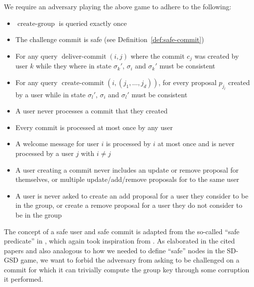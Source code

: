 \begin{definition}
	We require an adversary playing the above game to adhere to the following:
	\begin{itemize}
		\item $\operatorname{create-group}$ is queried exactly once
		\item The challenge commit is safe (see Definition~\ref{def:safe-commit})
		\item For any query $\operatorname{deliver-commit}(i, j)$ where the commit $c_j$ was created by user $k$ while they where in state $\sigma_k'$, $\sigma_i$ and $\sigma_k'$ must be consistent
		\item For any query $\operatorname{create-commit}(i, (j_1, \ldots, j_d))$, for every proposal $p_{j_l}$ created by a user while in state $\sigma_l'$, $\sigma_i$ and $\sigma_l'$ must be consistent
		\item A user never processes a commit that they created
		\item Every commit is processed at most once by any user
		\item A welcome message for user $i$ is processed by $i$ at most once and is never processed by a user $j$ with $i \neq j$
		\item A user creating a commit never includes an update or remove proposal for themselves, or multiple update/add/remove proposals for to the same user
		\item A user is never asked to create an add proposal for a user they consider to be in the group, or create a remove proposal for a user they do not consider to be in the group
	\end{itemize}
\end{definition}

The concept of a safe user and safe commit is adapted from the so-called ``safe predicate'' in \cite{ttkem}, which again took inspiration from \cite{rtreekem}. As elaborated in the cited papers and also analogous to how we needed to define ``safe'' nodes in the SD-GSD game, we want to forbid the adversary from asking to be challenged on a commit for which it can trivially compute the group key through some corruption it performed.

